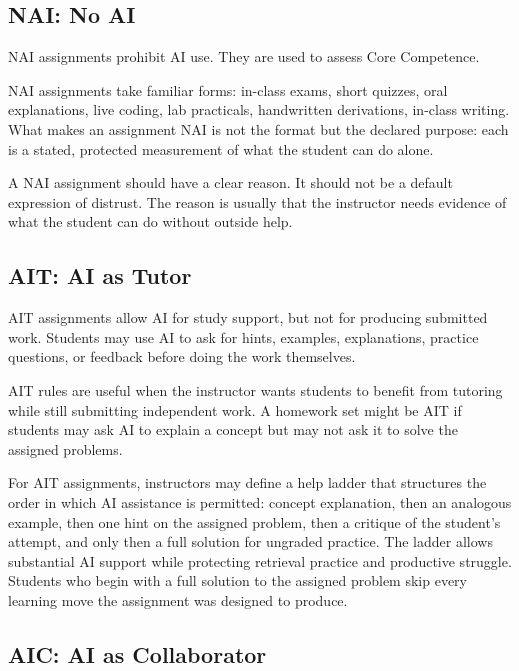 \documentclass{SIAMbook2023}
\newcommand{\NAI}{\textcolor{catNAI}{\textbf{NAI}}}
\newcommand{\AIT}{\textcolor{catAIT}{\textbf{AIT}}}
\newcommand{\AIC}{\textcolor{catAIC}{\textbf{AIC}}}
\begin{document}
\subsection{\texorpdfstring{\NAI{}: No AI}{NAI: No AI}}
\label{i:subsec:red}

NAI assignments prohibit AI use. They are used to assess Core Competence.

NAI assignments take familiar forms: in-class exams, short quizzes, oral explanations, live coding, lab practicals, handwritten derivations, in-class writing. What makes an assignment NAI is not the format but the declared purpose: each is a stated, protected measurement of what the student can do alone.

A NAI assignment should have a clear reason. It should not be a default expression of distrust. The reason is usually that the instructor needs evidence of what the student can do without outside help.

\subsection{\texorpdfstring{\AIT{}: AI as Tutor}{AIT: AI as Tutor}}
\label{i:subsec:yellow}

AIT assignments allow AI for study support, but not for producing submitted work. Students may use AI to ask for hints, examples, explanations, practice questions, or feedback before doing the work themselves.

AIT rules are useful when the instructor wants students to benefit from tutoring while still submitting independent work. A homework set might be AIT if students may ask AI to explain a concept but may not ask it to solve the assigned problems.

For AIT assignments, instructors may define a help ladder that structures the order in which AI assistance is permitted: concept explanation, then an analogous example, then one hint on the assigned problem, then a critique of the student's attempt, and only then a full solution for ungraded practice. The ladder allows substantial AI support while protecting retrieval practice and productive struggle. Students who begin with a full solution to the assigned problem skip every learning move the assignment was designed to produce.

\subsection{\texorpdfstring{\AIC{}: AI as Collaborator}{AIC: AI as Collaborator}}
\label{i:subsec:green}
\end{document}
